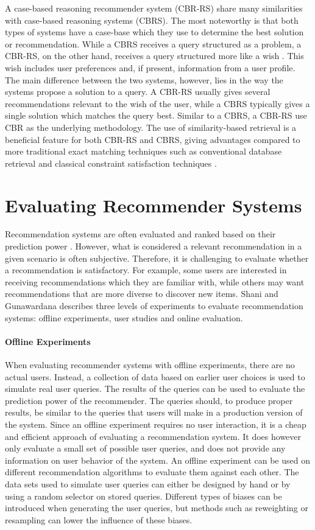 A case-based reasoning recommender system (CBR-RS) share many similarities with case-based reasoning systems (CBRS). The most noteworthy is that both types of systems have a case-base which they use to determine the best solution or recommendation. While a CBRS receives a query structured as a problem, a CBR-RS, on the other hand, receives a query structured more like a wish \cite{richter2013case}. This wish includes user preferences and, if present, information from a user profile. The main difference between the two systems, however, lies in the way the systems propose a solution to a query. A CBR-RS usually gives several recommendations relevant to the wish of the user, while a CBRS typically gives a single solution which matches the query best. Similar to a CBRS, a CBR-RS use CBR as the underlying methodology. The use of similarity-based retrieval is a beneficial feature for both CBR-RS and CBRS, giving advantages compared to more traditional exact matching techniques such as conventional database retrieval and classical constraint satisfaction techniques \cite{bridge2005case}.

\section{Evaluating Recommender Systems}

Recommendation systems are often evaluated and ranked based on their prediction power \cite{shani2011evaluating}. However, what is considered a relevant recommendation in a given scenario is often subjective. Therefore, it is challenging to evaluate whether a recommendation is satisfactory. For example, some users are interested in receiving recommendations which they are familiar with, while others may want recommendations that are more diverse to discover new items. Shani and Gunawardana \cite{shani2011evaluating} describes three levels of experiments to evaluate recommendation systems: offline experiments, user studies and online evaluation.

\paragraph{Offline Experiments} When evaluating recommender systems with offline experiments, there are no actual users. Instead, a collection of data based on earlier user choices is used to simulate real user queries. The results of the queries can be used to evaluate the prediction power of the recommender. The queries should, to produce proper results, be similar to the queries that users will make in a production version of the system. Since an offline experiment requires no user interaction, it is a cheap and efficient approach of evaluating a recommendation system. It does however only evaluate a small set of possible user queries, and does not provide any information on user behavior of the system.  An offline experiment can be used on different recommendation algorithms to evaluate them against each other. The data sets used to simulate user queries can either be designed by hand or by using a random selector on stored queries. Different types of biases can be introduced when generating the user queries, but methods such as reweighting or resampling can lower the influence of these biases. 

